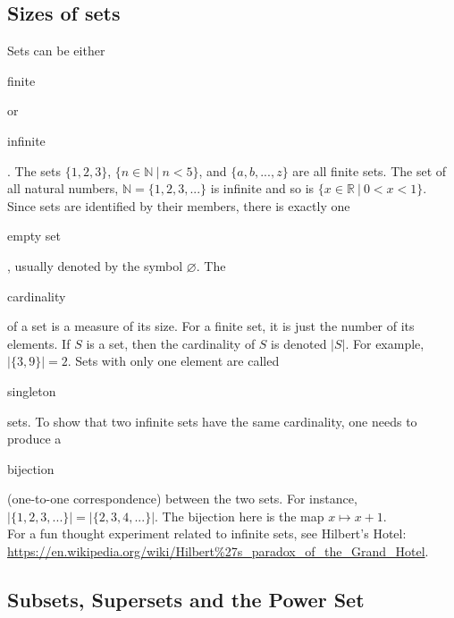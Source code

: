 \documentclass[11pt]{article}
\theoremstyle{plain}
\theoremstyle{definition}
\begin{document}
\subsection*{Sizes of sets}

\noindent Sets can be either \begin{em}finite\end{em} or \begin{em}infinite\end{em}. The sets $ \{ 1, 2, 3 \} $, $ \{ n \in \mathbb{N} \ | \ n < 5 \} $, and $ \{ a, b, ..., z \} $ are all finite sets. The set of all natural numbers, $ \mathbb{N} = \{ 1, 2, 3, ... \} $ is infinite and so is $ \{ x \in \mathbb{R} \ | \ 0 < x < 1 \} $. \\

\noindent Since sets are identified by their members, there is exactly one \begin{em}empty set\end{em}, usually denoted by the symbol $ \varnothing $. The \begin{em}cardinality\end{em} of a set is a measure of its size. For a finite set, it is just the number of its elements. If $ S $ is a set, then the cardinality of $ S $ is denoted $ | S | $. For example, $ | \{ 3, 9 \} | = 2 $. Sets with only one element are called \begin{em}singleton\end{em} sets. To show that two infinite sets have the same cardinality, one needs to produce a \begin{em}bijection\end{em} (one-to-one correspondence) between the two sets. For instance, $ | \{ 1, 2, 3, ... \} | = | \{ 2, 3, 4, ... \} | $. The bijection here is the map $ x \mapsto x + 1 $. \\

\noindent For a fun thought experiment related to infinite sets, see Hilbert's Hotel: \\
\url{https://en.wikipedia.org/wiki/Hilbert%27s_paradox_of_the_Grand_Hotel}.

\subsection*{Subsets, Supersets and the Power Set}
\end{document}
